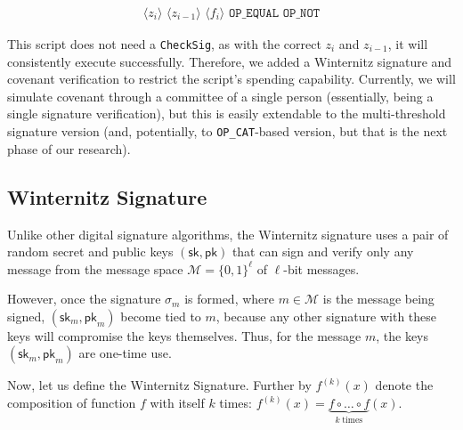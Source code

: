\documentclass{iacrtrans}
\newcommand{\elem}[1]{\, \langle #1 \rangle \,}
\newcommand{\opcode}[1]{\, \texttt{#1} \,}
\begin{document}
\begin{empheqboxed}
\begin{align*}
    \elem{z_i} \elem{z_{i-1}} \elem{f_i} \opcode{OP\_EQUAL} \opcode{OP\_NOT}
\end{align*}
\end{empheqboxed}

This script does not need a \texttt{CheckSig}, as with the correct \(z_i\) and \(z_{i-1}\), it will consistently execute successfully. Therefore, we added a Winternitz signature and covenant verification to restrict the script's spending capability. Currently, we will simulate covenant through a committee of a single person (essentially, being a single signature verification), but this is easily extendable to the multi-threshold signature version (and, potentially, to \texttt{OP\_CAT}-based version, but that is the next phase of our research).

\subsection{Winternitz Signature}\label{sec:lamport-signature}

Unlike other digital signature algorithms, the Winternitz signature
uses a pair of random secret and public keys
$(\mathsf{sk}, \mathsf{pk})$ that can sign and verify only any message
from the message space \(\mathcal{M} = {\{0, 1\}}^{\ell}\) of
$\ell$-bit messages.

However, once the signature $\sigma_{m}$ is formed, where
$m \in \mathcal{M}$ is the message being signed,
\((\mathsf{sk}_{m}, \mathsf{pk}_{m})\) become tied to \(m\), because
any other signature with these keys will compromise the keys
themselves. Thus, for the message \(m\), the keys
\((\mathsf{sk}_{m}, \mathsf{pk}_{m})\) are one-time use.

Now, let us define the Winternitz Signature. Further by $f^{(k)}(x)$
denote the composition of function $f$ with itself $k$ times:
$f^{(k)}(x) = \underbrace{f \circ \dots \circ f}_{k \; \text{times}}(x)$.
\end{document}
